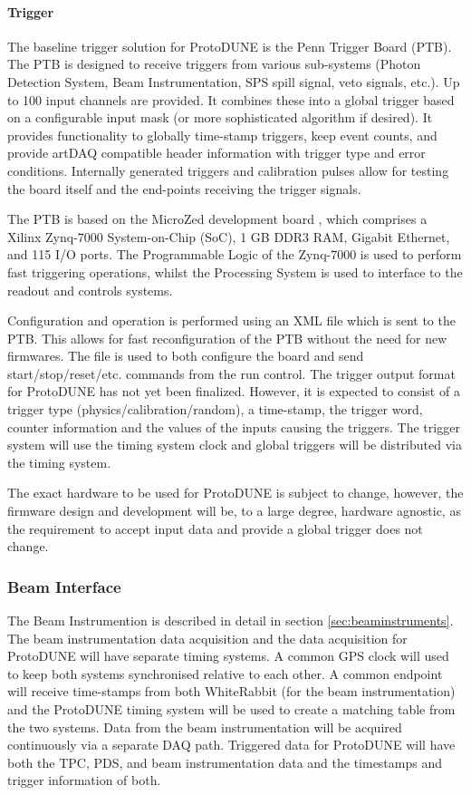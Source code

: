 \paragraph{Trigger}

The baseline trigger solution for ProtoDUNE is the Penn Trigger Board
(PTB). The PTB is designed to receive triggers from various sub-systems
(Photon Detection System, Beam Instrumentation, SPS spill signal, veto
signals, etc.).  Up to 100 input channels are provided.  It combines
these into a global trigger based on a configurable input mask (or
more sophisticated algorithm if desired).  It provides functionality
to globally time-stamp triggers, keep event counts, and provide artDAQ
compatible header information with trigger type and error conditions.
Internally generated triggers and calibration pulses allow for testing
the board itself and the end-points receiving the trigger signals.

The PTB is based on the MicroZed development board \cite{avnet:microzed}, which comprises a
Xilinx Zynq-7000 System-on-Chip (SoC), 1 GB DDR3 RAM, Gigabit Ethernet,
and 115 I/O ports.  The Programmable Logic of the Zynq-7000 is used to
perform fast triggering operations, whilst the Processing System is used
to interface to the readout and controls systems.

Configuration and operation is performed using an XML file which is sent
to the PTB.  This allows for fast reconfiguration of the PTB without
the need for new firmwares.  The file is used to both configure the board
and send start/stop/reset/etc. commands from the run control.
The trigger output format for ProtoDUNE has not yet been finalized.  
However, it is expected to consist of a trigger type (physics/calibration/random),
a time-stamp, the trigger word, counter information and the values 
of the inputs causing the triggers.  
The trigger system will use the timing system clock and global triggers will be
distributed via the timing system.  

The exact hardware to be used for ProtoDUNE is subject to change, 
however, the firmware design and development will be, to a large degree, hardware
agnostic, as the requirement to accept input data and provide a global trigger 
does not change.  

\subsubsection{Beam Interface}

The Beam Instrumention is described in detail in section \ref{sec:beaminstruments}.
The beam instrumentation data acquisition and the data acquisition for ProtoDUNE
will have separate timing systems.  A common GPS clock will used to keep both
systems synchronised relative to each other.  A common endpoint will receive time-stamps 
from both WhiteRabbit (for the beam instrumentation) and the ProtoDUNE timing system
will be used to create a matching table from the two systems.  Data from the beam
instrumentation will be acquired continuously via a separate DAQ path.  Triggered
data for ProtoDUNE will have both the TPC, PDS, and beam instrumentation data and 
the timestamps and trigger information of both.

